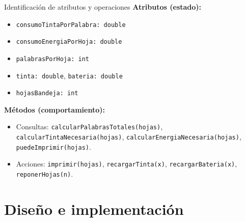\documentclass[aspectratio=169]{beamer}
\begin{document}
\begin{frame}{Identificación de atributos y operaciones}
  \textbf{Atributos (estado):}
  \begin{itemize}
    \item \texttt{consumoTintaPorPalabra: double}
    \item \texttt{consumoEnergiaPorHoja: double}
    \item \texttt{palabrasPorHoja: int}
    \item \texttt{tinta: double}, \texttt{bateria: double}
    \item \texttt{hojasBandeja: int}
  \end{itemize}
  \vspace{6pt}
  \textbf{Métodos (comportamiento):}
  \begin{itemize}
    \item Consultas: \texttt{calcularPalabrasTotales(hojas)}, \texttt{calcularTintaNecesaria(hojas)}, \texttt{calcularEnergiaNecesaria(hojas)}, \texttt{puedeImprimir(hojas)}.
    \item Acciones: \texttt{imprimir(hojas)}, \texttt{recargarTinta(x)}, \texttt{recargarBateria(x)}, \texttt{reponerHojas(n)}.
  \end{itemize}
\end{frame}

\section{Diseño e implementación}
\end{document}
